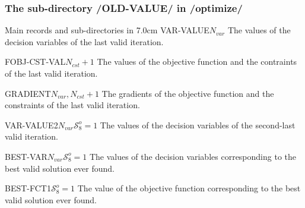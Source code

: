 \subsubsection{The sub-directory /OLD-VALUE/ in /optimize/}

\begin{DescriptionEnregistrement}{Main records and sub-directories in }{7.0cm}
\DbleEnr
{VAR-VALUE}{$N_{var}$}{}
{The values of the decision variables of the last valid iteration.}

\DbleEnr
{FOBJ-CST-VAL}{$N_{cst}+1$}{}
{The values of the objective function and the contraints of the last valid iteration.}

\DbleEnr
{GRADIENT}{$N_{var}, N_{cst}+1$}{}
{The gradients of the objective function and the constraints of the last valid iteration.}

\OptDbleEnr
{VAR-VALUE2}{$N_{var}$}{$\mathcal{S}^{o}_{8}=1$}{}
{The values of the decision variables of the second-last valid iteration.}

\OptDbleEnr
{BEST-VAR}{$N_{var}$}{$\mathcal{S}^{o}_{8}=1$}{}
{The values of the decision variables corresponding to the best valid solution ever found.}

\OptDbleEnr
{BEST-FCT}{1}{$\mathcal{S}^{o}_{8}=1$}{}
{The value of the objective function corresponding to the best valid solution ever found.}

\end{DescriptionEnregistrement}
\clearpage

